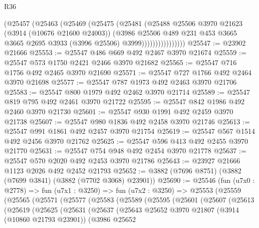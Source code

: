 \begin{lexlean}{R36}
\begin{coremodule}
                      (@25457
                        (@25463
                          (@25469
                            (@25475
                              (@25481
                                (@25488
                                  @25506
                                  @3970
                                  @21623
                                  (@3914 (@10676 @21600 @24003))
                                  (@3986
                                    @25506
                                    @489
                                    @231
                                    @453
                                    @3665
                                    @3665
                                    @2695
                                    @3933
                                    (@3996 @25506)
                                    @3999))))))))))))))))
@25547 := @23902 @21666
@25553 := @25547 @486 @669 @492 @2467 @3970 @21674
@25559 := @25547 @573 @1750 @2421 @2466 @3970 @21682
@25565 := @25547 @716 @1756 @492 @2465 @3970 @21690
@25571 := @25547 @727 @1766 @492 @2464 @3970 @21698
@25577 := @25547 @787 @1973 @492 @2463 @3970 @21706
@25583 := @25547 @800 @1979 @492 @2462 @3970 @21714
@25589 := @25547 @819 @795 @492 @2461 @3970 @21722
@25595 := @25547 @842 @1986 @492 @2460 @3970 @21730
@25601 := @25547 @930 @1991 @492 @2459 @3970 @21738
@25607 := @25547 @980 @1836 @492 @2458 @3970 @21746
@25613 := @25547 @991 @1861 @492 @2457 @3970 @21754
@25619 := @25547 @567 @1514 @492 @2456 @3970 @21762
@25625 := @25547 @596 @413 @492 @2455 @3970 @21770
@25631 := @25547 @754 @948 @492 @2454 @3970 @21778
@25637 := @25547 @570 @2020 @492 @2453 @3970 @21786
@25643 := @23927 @21666 @1123 @2026 @492 @2452 @21793
@25652 := @3882 (@7696 @8751) (@3882 (@7699 @3841) (@3882 (@7702 @3068) @23901))
@25690 := @25546
    (fun (u7x0 : @2778) =>
    fun (u7x1 : @3250) =>
    fun (u7x2 : @3250) =>
    @25553
      (@25559
        (@25565
          (@25571
            (@25577
              (@25583
                (@25589
                  (@25595
                    (@25601
                      (@25607
                        (@25613
                          (@25619
                            (@25625
                              (@25631
                                (@25637
                                  (@25643
                                    @25652
                                    @3970
                                    @21807
                                    (@3914 (@10860 @21793 @23901))
                                    (@3986
                                      @25652

\end{coremodule}
\end{lexlean}
